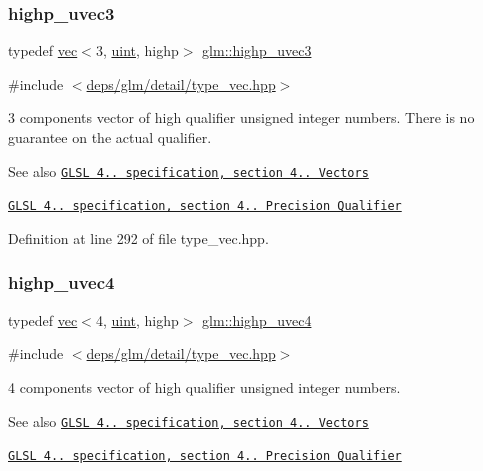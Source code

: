 \subsubsection{\texorpdfstring{highp\+\_\+uvec3}{highp\_uvec3}}
{\footnotesize\ttfamily typedef \hyperlink{structglm_1_1vec}{vec}$<$3, \hyperlink{group__core__precision_ga4fd29415871152bfb5abd588334147c8}{uint}, highp$>$ \hyperlink{group__core__precision_ga2e16953ad75ce0c6d7faa921ca006ce5}{glm\+::highp\+\_\+uvec3}}



{\ttfamily \#include $<$\hyperlink{type__vec_8hpp}{deps/glm/detail/type\+\_\+vec.\+hpp}$>$}

3 components vector of high qualifier unsigned integer numbers. There is no guarantee on the actual qualifier.

\begin{DoxySeeAlso}{See also}
\href{http://www.opengl.org/registry/doc/GLSLangSpec.4.20.8.pdf}{\tt G\+L\+SL 4.. specification, section 4.. Vectors} 

\href{http://www.opengl.org/registry/doc/GLSLangSpec.4.20.8.pdf}{\tt G\+L\+SL 4.. specification, section 4.. Precision Qualifier} 
\end{DoxySeeAlso}


Definition at line 292 of file type\+\_\+vec.\+hpp.

\mbox{\label{group__core__precision_gae48d6e9a99afc33e6fa51e5d576dfd1a}} 
\subsubsection{\texorpdfstring{highp\+\_\+uvec4}{highp\_uvec4}}
{\footnotesize\ttfamily typedef \hyperlink{structglm_1_1vec}{vec}$<$4, \hyperlink{group__core__precision_ga4fd29415871152bfb5abd588334147c8}{uint}, highp$>$ \hyperlink{group__core__precision_gae48d6e9a99afc33e6fa51e5d576dfd1a}{glm\+::highp\+\_\+uvec4}}



{\ttfamily \#include $<$\hyperlink{type__vec_8hpp}{deps/glm/detail/type\+\_\+vec.\+hpp}$>$}

4 components vector of high qualifier unsigned integer numbers.

\begin{DoxySeeAlso}{See also}
\href{http://www.opengl.org/registry/doc/GLSLangSpec.4.20.8.pdf}{\tt G\+L\+SL 4.. specification, section 4.. Vectors} 

\href{http://www.opengl.org/registry/doc/GLSLangSpec.4.20.8.pdf}{\tt G\+L\+SL 4.. specification, section 4.. Precision Qualifier} 
\end{DoxySeeAlso}


